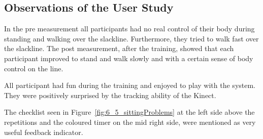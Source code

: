 \begin{table}[htb]
\centering
\caption{Interaction, time, and group effects on single leg stance, walking steps, and walked distance}
\label{tab:6_4_mainEffects}
\end{table}

\subsection{Observations of the User Study}\label{results_interview}
In the pre measurement all participants had no real control of their body during standing and walking over the slackline.
Furthermore, they tried to walk fast over the slackline.
The post measurement, after the training, showed that each participant improved to stand and walk slowly and with a certain sense of body control on the line.

All participant had fun during the training and enjoyed to play with the system.
They were positively surprised by the tracking ability of the Kinect.

The checklist seen in Figure~\ref{fig:6_5_sittingProblems} at the left side above the repetitions and the coloured timer on the mid right side, were mentioned as very useful feedback indicator.

